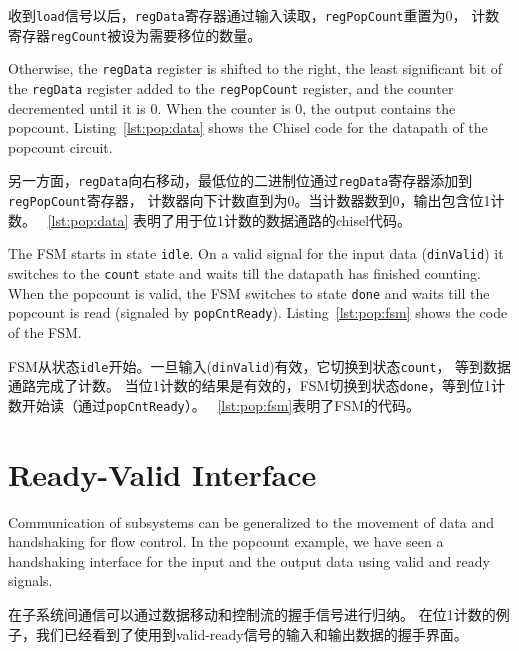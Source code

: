 \documentclass[%
    10pt,
    headinclude, footexclude,
    openright, %
    notitlepage,
    cleardoubleempty,
    headsepline,
    pointlessnumbers,
    bibtotoc, idxtotoc,
    ]{scrbook}
\newcommand{\code}[1]{{\small{\texttt{#1}}}}
\newcommand{\todo}[1]{{\emph{TODO: #1}}}
\renewcommand{\todo}[1]{}
\begin{document}
收到\code{load}信号以后，\code{regData}寄存器通过输入读取，\code{regPopCount}重置为0，
计数寄存器\code{regCount}被设为需要移位的数量。

Otherwise, the \code{regData} register is shifted to the right, the least significant bit
of the \code{regData} register added to the \code{regPopCount} register, and the counter
decremented until it is 0. When the counter is 0, the output contains the popcount.
Listing~\ref{lst:pop:data} shows the Chisel code for the datapath of the popcount
circuit.

另一方面，\code{regData}向右移动，最低位的二进制位通过\code{regData}寄存器添加到\code{regPopCount}寄存器，
计数器向下计数直到为0。当计数器数到0，输出包含位1计数。
~\ref{lst:pop:data} 表明了用于位1计数的数据通路的chisel代码。


The FSM starts in state \code{idle}. On a valid signal for the input data (\code{dinValid}) it
switches to the \code{count} state and waits till the datapath has finished counting.
When the popcount is valid, the FSM switches to state \code{done} and waits till the
popcount is read (signaled by \code{popCntReady}).
Listing~\ref{lst:pop:fsm} shows the code of the FSM.

FSM从状态\code{idle}开始。一旦输入(\code{dinValid})有效，它切换到状态\code{count}，
等到数据通路完成了计数。
当位1计数的结果是有效的，FSM切换到状态\code{done}，等到位1计数开始读（通过\code{popCntReady}）。
~\ref{lst:pop:fsm}表明了FSM的代码。


\section{Ready-Valid Interface}

\todo{Luca: This comes very sudden after all this FSM reading.
Maybe give some more context and a timing diagram.}

Communication of subsystems can be generalized to the movement
of data and handshaking for flow control. In the popcount example,
we have seen a handshaking interface for the input and the output data
using valid and ready signals.

在子系统间通信可以通过数据移动和控制流的握手信号进行归纳。
在位1计数的例子，我们已经看到了使用到valid-ready信号的输入和输出数据的握手界面。
\end{document}
